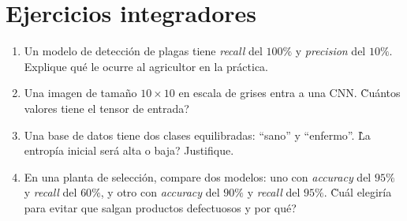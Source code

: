 \documentclass[12pt]{article}
\begin{document}

\section{Ejercicios integradores}

\begin{enumerate}[label=\arabic*.]
    \item Un modelo de detección de plagas tiene \textit{recall} del \(100\%\) y \textit{precision} del \(10\%\). Explique qué le ocurre al agricultor en la práctica.
    \item Una imagen de tamaño \(10\times 10\) en escala de grises entra a una CNN. \`Cuántos valores tiene el tensor de entrada?
    \item Una base de datos tiene dos clases equilibradas: ``sano'' y ``enfermo''. \`La entropía inicial será alta o baja? Justifique.
    \item En una planta de selección, compare dos modelos: uno con \textit{accuracy} del \(95\%\) y \textit{recall} del \(60\%\), y otro con \textit{accuracy} del \(90\%\) y \textit{recall} del \(95\%\). \`Cuál elegiría para evitar que salgan productos defectuosos y por qué?
\end{enumerate}
\end{document}
